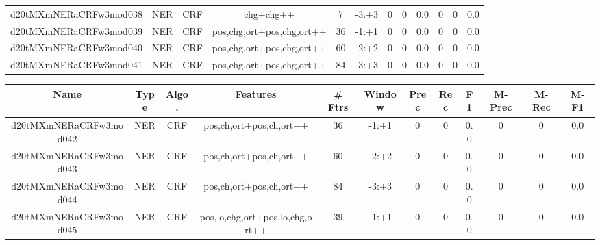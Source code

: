 \documentclass[a4paper]{article}
\begin{document}
\begin{landscape}
\begin{center}
\begin{tabular}{ |c|c|c|c|c|c|c|c|c|c|c|c|}
 
 	
 	\small{ d20tMXmNERaCRFw3mod038 } & \small{ NER} & \small{  CRF }  & chg+chg++  &  7 &  \small{  -3:+3 }  &  0 & 0 & 0.0  &  0 & 0 & 0.0 \\
 	

 
 	
 	\small{ d20tMXmNERaCRFw3mod039 } & \small{ NER} & \small{  CRF }  & pos,chg,ort+pos,chg,ort++  &  36 &  \small{  -1:+1 }  &  0 & 0 & 0.0  &  0 & 0 & 0.0 \\
 	

 
 	
 	\small{ d20tMXmNERaCRFw3mod040 } & \small{ NER} & \small{  CRF }  & pos,chg,ort+pos,chg,ort++  &  60 &  \small{  -2:+2 }  &  0 & 0 & 0.0  &  0 & 0 & 0.0 \\
 	

 
 	
 	\small{ d20tMXmNERaCRFw3mod041 } & \small{ NER} & \small{  CRF }  & pos,chg,ort+pos,chg,ort++  &  84 &  \small{  -3:+3 }  &  0 & 0 & 0.0  &  0 & 0 & 0.0 \\
 	
 \hline
\end{tabular}
\end{center}




\begin{center}
\begin{tabular}{ |c|c|c|c|c|c|c|c|c|c|c|c|} 
 \hline
 	Name & Type & Algo. & Features & \# Ftrs & Window & Prec & Rec & F1 & M-Prec & M-Rec & M-F1\\
 \hline

 	

 
 	
 	\small{ d20tMXmNERaCRFw3mod042 } & \small{ NER} & \small{  CRF }  & pos,ch,ort+pos,ch,ort++  &  36 &  \small{  -1:+1 }  &  0 & 0 & 0.0  &  0 & 0 & 0.0 \\
 	

 
 	
 	\small{ d20tMXmNERaCRFw3mod043 } & \small{ NER} & \small{  CRF }  & pos,ch,ort+pos,ch,ort++  &  60 &  \small{  -2:+2 }  &  0 & 0 & 0.0  &  0 & 0 & 0.0 \\
 	

 
 	
 	\small{ d20tMXmNERaCRFw3mod044 } & \small{ NER} & \small{  CRF }  & pos,ch,ort+pos,ch,ort++  &  84 &  \small{  -3:+3 }  &  0 & 0 & 0.0  &  0 & 0 & 0.0 \\
 	

 
 	
 	\small{ d20tMXmNERaCRFw3mod045 } & \small{ NER} & \small{  CRF }  & pos,lo,chg,ort+pos,lo,chg,ort++  &  39 &  \small{  -1:+1 }  &  0 & 0 & 0.0  &  0 & 0 & 0.0 \\
 	


\end{tabular}
\end{center}
\end{landscape}
\end{document}
